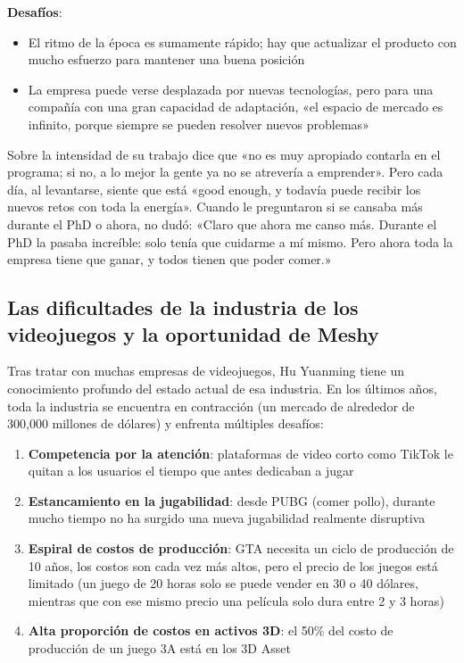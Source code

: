 \documentclass[a4paper]{article}
\begin{document}
\textbf{Desafíos}:
\begin{itemize}
\item El ritmo de la época es sumamente rápido; hay que actualizar el producto con mucho esfuerzo para mantener una buena posición
\item La empresa puede verse desplazada por nuevas tecnologías, pero para una compañía con una gran capacidad de adaptación, «el espacio de mercado es infinito, porque siempre se pueden resolver nuevos problemas»
\end{itemize}

Sobre la intensidad de su trabajo dice que «no es muy apropiado contarla en el programa; si no, a lo mejor la gente ya no se atrevería a emprender». Pero cada día, al levantarse, siente que está «good enough, y todavía puede recibir los nuevos retos con toda la energía». Cuando le preguntaron si se cansaba más durante el PhD o ahora, no dudó: «Claro que ahora me canso más. Durante el PhD la pasaba increíble: solo tenía que cuidarme a mí mismo. Pero ahora toda la empresa tiene que ganar, y todos tienen que poder comer.»

\subsection{Las dificultades de la industria de los videojuegos y la oportunidad de Meshy}

Tras tratar con muchas empresas de videojuegos, Hu Yuanming tiene un conocimiento profundo del estado actual de esa industria. En los últimos años, toda la industria se encuentra en contracción (un mercado de alrededor de 300,000 millones de dólares) y enfrenta múltiples desafíos:

\begin{enumerate}
\item \textbf{Competencia por la atención}: plataformas de video corto como TikTok le quitan a los usuarios el tiempo que antes dedicaban a jugar
\item \textbf{Estancamiento en la jugabilidad}: desde PUBG (comer pollo), durante mucho tiempo no ha surgido una nueva jugabilidad realmente disruptiva
\item \textbf{Espiral de costos de producción}: GTA necesita un ciclo de producción de 10 años, los costos son cada vez más altos, pero el precio de los juegos está limitado (un juego de 20 horas solo se puede vender en 30 o 40 dólares, mientras que con ese mismo precio una película solo dura entre 2 y 3 horas)
\item \textbf{Alta proporción de costos en activos 3D}: el 50\% del costo de producción de un juego 3A está en los 3D Asset
\end{enumerate}
\end{document}
